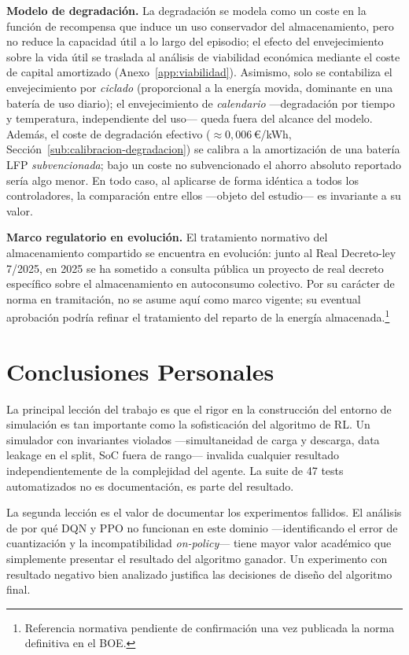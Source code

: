 \documentclass[12pt, a4paper, twoside]{report}
\begin{document}
\textbf{Modelo de degradación.} La degradación se modela como un coste en la
función de recompensa que induce un uso conservador del almacenamiento, pero no
reduce la capacidad útil a lo largo del episodio; el efecto del envejecimiento
sobre la vida útil se traslada al análisis de viabilidad económica mediante el
coste de capital amortizado (Anexo~\ref{app:viabilidad}). Asimismo, solo se
contabiliza el envejecimiento por \emph{ciclado} (proporcional a la energía
movida, dominante en una batería de uso diario); el envejecimiento de
\emph{calendario} —degradación por tiempo y temperatura, independiente del uso—
queda fuera del alcance del modelo. Además, el coste de
degradación efectivo ($\approx0{,}006$\,€/kWh, Sección~\ref{sub:calibracion-degradacion})
se calibra a la amortización de una batería LFP \emph{subvencionada}; bajo un
coste no subvencionado el ahorro absoluto reportado sería algo menor. En todo
caso, al aplicarse de forma idéntica a todos los controladores, la comparación
entre ellos —objeto del estudio— es invariante a su valor.

\textbf{Marco regulatorio en evolución.} El tratamiento normativo del
almacenamiento compartido se encuentra en evolución: junto al Real Decreto-ley
7/2025, en 2025 se ha sometido a consulta pública un proyecto de real decreto
específico sobre el almacenamiento en autoconsumo colectivo. Por su carácter de
norma en tramitación, no se asume aquí como marco vigente; su eventual aprobación
podría refinar el tratamiento del reparto de la energía
almacenada.\footnote{Referencia normativa pendiente de confirmación una vez
publicada la norma definitiva en el BOE.}

\section{Conclusiones Personales}

La principal lección del trabajo es que el rigor en la construcción del entorno
de simulación es tan importante como la sofisticación del algoritmo de RL. Un
simulador con invariantes violados —simultaneidad de carga y descarga, data
leakage en el split, SoC fuera de rango— invalida cualquier resultado
independientemente de la complejidad del agente. La suite de 47 tests
automatizados no es documentación, es parte del resultado.

La segunda lección es el valor de documentar los experimentos fallidos. El
análisis de por qué DQN y PPO no funcionan en este dominio —identificando el
error de cuantización y la incompatibilidad \textit{on-policy}— tiene mayor
valor académico que simplemente presentar el resultado del algoritmo ganador.
Un experimento con resultado negativo bien analizado justifica las decisiones
de diseño del algoritmo final.
\end{document}
